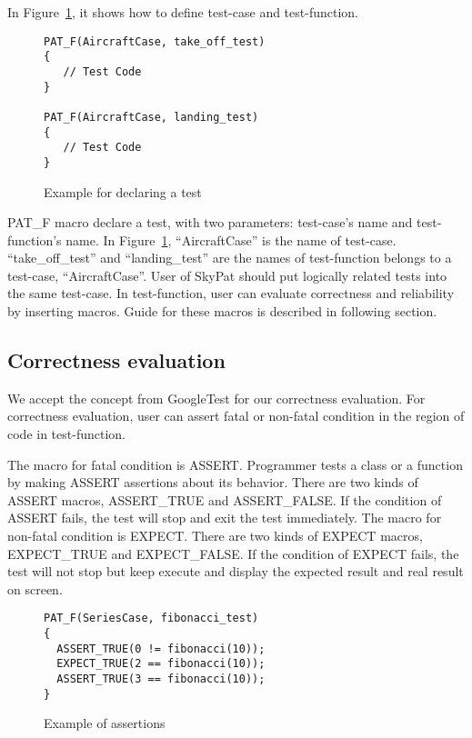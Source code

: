 \documentclass[final]{ols}
\begin{document}
In Figure~\ref{aircraftcase}, it shows how to define test-case and test-function.

\begin{figure}[h]
\lstset{language=C++}
\begin{lstlisting}[frame=single]
PAT_F(AircraftCase, take_off_test)
{
   // Test Code
}

PAT_F(AircraftCase, landing_test)
{
   // Test Code
}
\end{lstlisting}
\caption{Example for declaring a test}
\label{aircraftcase}
\end{figure}

PAT\_F macro declare a test, with two parameters: test-case's name and test-function's name.
In Figure~\ref{aircraftcase}, ``AircraftCase'' is the name of test-case. 
``take\_off\_test'' and ``landing\_test'' are the names of test-function belongs to a test-case, ``AircraftCase''.
User of SkyPat should put logically related tests into the same test-case.
In test-function, user can evaluate correctness and reliability by inserting macros.
Guide for these macros is described in following section.

\subsection{Correctness evaluation}
We accept the concept from GoogleTest for our correctness evaluation.
For correctness evaluation, user can assert fatal or non-fatal condition in the region of code in test-function.

The macro for fatal condition is ASSERT.
Programmer tests a class or a function by making ASSERT assertions about its behavior. 
There are two kinds of ASSERT macros, ASSERT\_TRUE and ASSERT\_FALSE. 
If the condition of ASSERT fails, the test will stop and exit the test immediately. 
The macro for non-fatal condition is EXPECT.
There are two kinds of EXPECT macros, EXPECT\_TRUE and EXPECT\_FALSE.
If the condition of EXPECT fails, the test will not stop but keep execute and display the expected result and real result on screen.

\begin{figure}[h]
\lstset{language=C++}
\begin{lstlisting}[frame=single]
PAT_F(SeriesCase, fibonacci_test)
{
  ASSERT_TRUE(0 != fibonacci(10));
  EXPECT_TRUE(2 == fibonacci(10));
  ASSERT_TRUE(3 == fibonacci(10));
}
\end{lstlisting}
\caption{Example of assertions}
\label{assert_example}
\end{figure}
\end{document}
